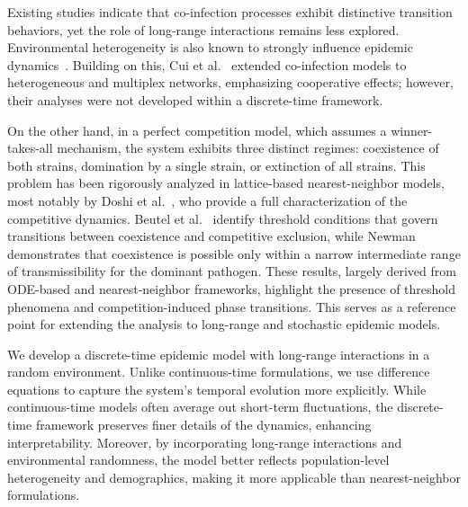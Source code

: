 \documentclass[a4paper,12pt]{scrartcl}
\theoremstyle{plain}%
\theoremstyle{definition}
\theoremstyle{remark}
\numberwithin{equation}{section}
\begin{document}
Existing studies indicate that co-infection processes exhibit distinctive transition behaviors, yet the role of long-range interactions remains less  explored. Environmental heterogeneity is also known to strongly influence epidemic dynamics~\cite{sanz2014dynamics, hebert2015complexity}. Building on this, Cui et al.~\cite{cui2017mutually,cui2019epidemic} extended co-infection models to heterogeneous and multiplex networks, emphasizing cooperative effects; however, their analyses were not developed within a discrete-time framework.

On the other hand, in a perfect competition model, which assumes a winner-takes-all mechanism, the system exhibits three distinct regimes: coexistence of both strains, domination by a single strain, or extinction of all strains. This problem has been rigorously analyzed in lattice-based nearest-neighbor models, most notably by Doshi et al.~\cite{doshi2021competing}, who provide a full characterization of the competitive dynamics. Beutel et al.~\cite{beutel2012interacting} identify threshold conditions that govern transitions between coexistence and competitive exclusion, while Newman~\cite{newman2005threshold} demonstrates that coexistence is possible only within a narrow intermediate range of transmissibility for the dominant pathogen. These results, largely derived from ODE-based and nearest-neighbor frameworks, highlight the presence of threshold phenomena and competition-induced phase transitions. This serves as a reference point for extending the analysis to long-range and stochastic epidemic models.

We develop a discrete-time epidemic model with long-range interactions in a random environment. Unlike continuous-time formulations, we use difference equations to capture the system's temporal evolution more explicitly. While continuous-time models often average out short-term fluctuations, the discrete-time framework preserves finer details of the dynamics, enhancing interpretability. Moreover, by incorporating long-range interactions and environmental randomness, the model better reflects population-level heterogeneity and demographics, making it more applicable than nearest-neighbor formulations.
\end{document}
